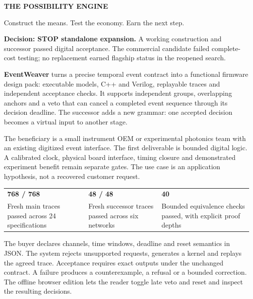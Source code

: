 \documentclass[10pt,letterpaper]{article}
\newcommand{\briefhead}[1]{\vspace{7pt}{\large\bfseries\color{Teal}#1}\par}
\begin{document}
{\fontsize{30}{33}\selectfont\bfseries THE POSSIBILITY ENGINE}\par
{\large Construct the means. Test the economy. Earn the next step.}\par
\vspace{7pt}
\colorbox{Pale}{\parbox{.96\textwidth}{\textbf{Decision: STOP standalone expansion.} A working construction and successor passed digital acceptance. The commercial candidate failed complete-cost testing; no replacement earned flagship status in the reopened search.}}

\briefhead{What was built}
\textbf{EventWeaver} turns a precise temporal event contract into a functional firmware design pack: executable models, C++ and Verilog, replayable traces and independent acceptance checks. It supports independent groups, overlapping anchors and a veto that can cancel a completed event sequence through its decision deadline. The successor adds a new grammar: one accepted decision becomes a virtual input to another stage.

The beneficiary is a small instrument OEM or experimental photonics team with an existing digitized event interface. The first deliverable is bounded digital logic. A calibrated clock, physical board interface, timing closure and demonstrated experiment benefit remain separate gates. The use case is an application hypothesis, not a recovered customer request.

\begin{center}
\begin{tabular}{L{.29\textwidth}L{.29\textwidth}L{.29\textwidth}}
\toprule
{\Large\color{Teal}\textbf{768 / 768}} & {\Large\color{Teal}\textbf{48 / 48}} & {\Large\color{Teal}\textbf{40}}\\
Fresh main traces passed across 24 specifications & Fresh successor traces passed across six networks & Bounded equivalence checks passed, with explicit proof depths\\
\bottomrule
\end{tabular}
\end{center}

\briefhead{The first experience}
The buyer declares channels, time windows, deadline and reset semantics in JSON. The system rejects unsupported requests, generates a kernel and replays the agreed trace. Acceptance requires exact outputs under the unchanged contract. A failure produces a counterexample, a refusal or a bounded correction. The offline browser edition lets the reader toggle late veto and reset and inspect the resulting decisions.
\end{document}
